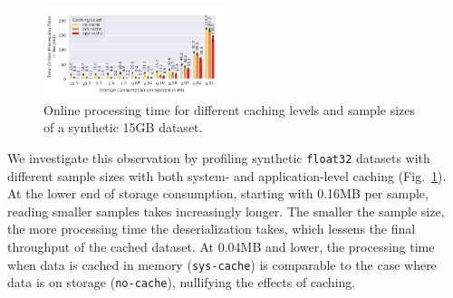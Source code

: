 {\begin{figure}[h]
    \includegraphics[width=0.47\textwidth]{figures/misc/synthetic-dataset-all-caches}
    \vspace{-14pt}
    \caption{{\color{diff}Online processing time for different caching levels and sample sizes of a synthetic 15\:GB dataset.}}
    \label{fig:synthetic-dataset-cached-general}
\end{figure}
}

{\color{diff2}

We investigate this observation by profiling synthetic \texttt{float32} datasets with different sample sizes with both system- and application-level caching (Fig.~\ref{fig:synthetic-dataset-cached-general}).
At the lower end of storage consumption, starting with 0.16\:MB per sample, reading smaller samples takes increasingly longer.
The smaller the sample size, the more processing time the deserialization takes, which lessens the final throughput of the cached dataset.
At 0.04\:MB and lower, the processing time when data is cached in memory (\texttt{sys-cache}) is comparable to the case where data is on storage (\texttt{no-cache}), nullifying the effects of caching.

}

